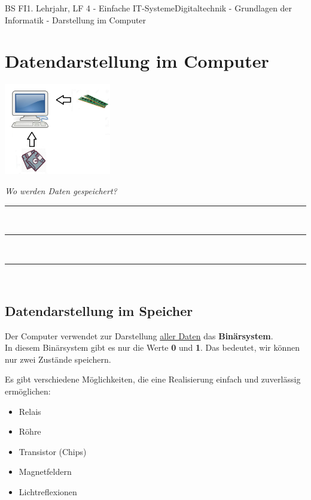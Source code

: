 \documentclass[11pt,twocolumn,oneside,openany,headings=optiontotoc,11pt,numbers=noenddot]{article}
\begin{document}
	\begin{worksheet}{BS FI}{1. Lehrjahr, LF 4 - Einfache IT-Systeme}{Digitaltechnik - Grundlagen der Informatik - Darstellung im Computer}
		\section{Datendarstellung im Computer}
		\begin{center}
			\includegraphics[width=0.35\textwidth]{../99_Bilder/overview.png}
		\end{center}
		
		\textit{Wo werden Daten gespeichert?}\\
		\par
		\rule{0.43\textwidth}{0.1pt}\\
		\par
		\rule{0.43\textwidth}{0.1pt}\\
		\par
		\rule{0.43\textwidth}{0.1pt}\\
		\subsection*{Datendarstellung im Speicher} Der Computer verwendet zur Darstellung \underline{aller Daten} das \textbf{Binärsystem}.\\
		In diesem Binärsystem gibt es nur die Werte \textbf{0} und \textbf{1}. Das bedeutet, wir können nur zwei Zustände speichern.\\
		\par\noindent
		Es gibt verschiedene Möglichkeiten, die eine Realisierung einfach und zuverlässig ermöglichen:
		\begin{itemize}
			\item Relais
			\item Röhre
			\item Transistor (Chips)
			\item Magnetfeldern
			\item Lichtreflexionen
		\end{itemize}

\end{worksheet}
\end{document}
